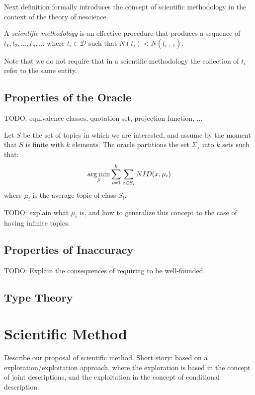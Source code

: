 Next definition formally introduces the concept of scientific methodology in the context of the theory of nescience.

\begin{definition}
A \emph{scientific methodology} is an effective procedure that produces a sequence of $t_1, t_2, \ldots, t_n, \ldots$ where $t_i \in \mathcal{D}$ such that $N(t_i) < N(t_{i+1})$.
\end{definition}

Note that we do not require that in a scientific methodology the collection of $t_i$ refer to the same entity.


\subsection{Properties of the Oracle}

{\color{red} TODO: equivalence classes, quotation set, projection function, ...}

Let $S$ be the set of topics in which we are interested, and assume by the moment that $S$ is finite with $k$ elements. The oracle partitions the set $\Sigma_\star$ into $k$ sets such that:
\[
\operatorname*{arg\,min}_S \sum_{i=1}^k \sum_{x \in S_i} NID(x, \mu_i)
\]
where $\mu_i$ is the average topic of class $S_i$.

{\color{red} TODO: explain what $\mu_i$ is, and how to generalize this concept to the case of having infinite topics.}


\subsection{Properties of Inaccuracy}

{\color{red} TODO: Explain the consequences of requiring to be well-founded.}

% 

\subsection{Type Theory}


%
%

\section{Scientific Method}

{\color{red} Describe our proposal of scientific method. Short story: based on a exploration/exploitation approach, where the exploration is based in the concept of joint descriptions, and the exploitation in the concept of conditional description.}

